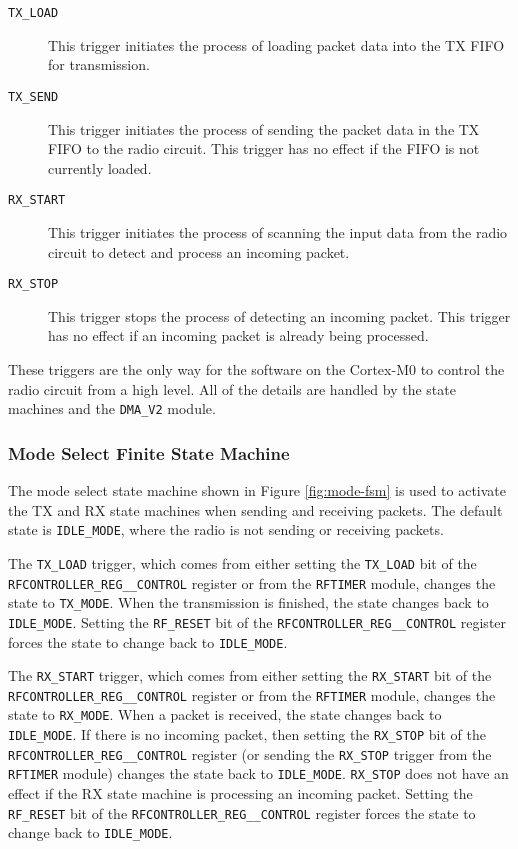 \begin{description}
	\item[\texttt{TX\_LOAD}] This trigger initiates the process of loading packet data into the TX FIFO for transmission.
	\item[\texttt{TX\_SEND}] This trigger initiates the process of sending the packet data in the TX FIFO to the radio circuit. This trigger has no effect if the FIFO is not currently loaded.
	\item[\texttt{RX\_START}] This trigger initiates the process of scanning the input data from the radio circuit to detect and process an incoming packet.
	\item[\texttt{RX\_STOP}] This trigger stops the process of detecting an incoming packet. This trigger has no effect if an incoming packet is already being processed.
\end{description}

These triggers are the only way for the software on the Cortex-M0 to control the radio circuit from a high level. All of the details are handled by the state machines and the \texttt{DMA\_V2} module.

\subsubsection{Mode Select Finite State Machine}
The mode select state machine shown in Figure \ref{fig:mode-fsm} is used to activate the TX and RX state machines when sending and receiving packets. The default state is \texttt{IDLE\_MODE}, where the radio is not sending or receiving packets.

The \texttt{TX\_LOAD} trigger, which comes from either setting the \texttt{TX\_LOAD} bit of the \texttt{RFCONTROLLER\_REG\_\_CONTROL} register or from the \texttt{RFTIMER} module, changes the state to \texttt{TX\_MODE}. When the transmission is finished, the state changes back to \texttt{IDLE\-\_MODE}. Setting the \texttt{RF\_RESET} bit of the \texttt{RFCONTROLLER\_REG\_\_CONTROL} register forces the state to change back to \texttt{IDLE\_MODE}.

The \texttt{RX\_START} trigger, which comes from either setting the \texttt{RX\_START} bit of the \texttt{RFCONTROLLER\_REG\_\_CONTROL} register or from the \texttt{RFTIMER} module, changes the state to \texttt{RX\_MODE}. When a packet is received, the state changes back to \texttt{IDLE\_MODE}. If there is no incoming packet, then setting the \texttt{RX\_STOP} bit of the \texttt{RFCONTROLLER\_REG\-\_\_CONTROL} register (or sending the \texttt{RX\_STOP} trigger from the \texttt{RFTIMER} module) changes the state back to \texttt{IDLE\_MODE}. \texttt{RX\_STOP} does not have an effect if the RX state machine is processing an incoming packet. Setting the \texttt{RF\_RESET} bit of the \texttt{RFCONTROLLER\_REG\_\_CONTROL} register forces the state to change back to \texttt{IDLE\_MODE}.

